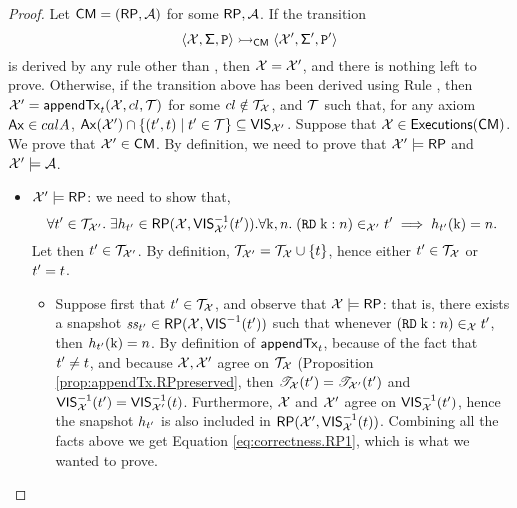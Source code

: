 \begin{proof}
Let $\mathsf{CM} = (\mathsf{RP}, \mathcal{A})$ for some $\mathsf{RP}, \mathcal{A}$.
If the transition 
\[ 
\langle \mathcal{X}, \mathsf{\Sigma}, \texttt{P} \rangle \rightarrowtail_{\mathsf{CM}} 
\langle \mathcal{X}', \mathsf{\Sigma}', \texttt{P}' \rangle
\] 
is derived by any rule other than , then $\mathcal{X} = \mathcal{X}'$, and there is nothing 
left to prove. 
Otherwise, if the transition above has been derived using Rule , 
then $\mathcal{X}' = \mathsf{appendTx}_{t}(\mathcal{X}, cl, \mathcal{T})$ for some $cl \notin \mathcal{T}_{\mathcal{X}}$, 
and $\mathcal{T}$ such that, for any axiom $\mathsf{Ax} \in calA$, $\mathsf{Ax}(\mathcal{X}') \cap \{(t', t) \mid t' \in \mathcal{T}\} 
\subseteq {\mathsf{VIS}}_{\mathcal{X}'}$. 
Suppose that $\mathcal{X} \in {\mathsf{Executions}}(\mathsf{CM})$. We prove that $\mathcal{X}' \in \mathsf{CM}$. 
By definition, we need to prove that $\mathcal{X}' \models \mathsf{RP}$ and $\mathcal{X}' \models \mathcal{A}$.
	\begin{itemize}
		\item  $\mathcal{X}' \models \mathsf{RP}$: we need to show that, 
		\begin{equation}
		\label{eq:correctness.RP1}
		\forall t' \in \mathcal{T}_{\mathcal{X}'}.\; \exists h_{t'} \in \mathsf{RP}(\mathcal{X}, {\mathsf{VIS}}^{-1}_{\mathcal{X}'}(t')).
		\forall \mathrm{k},n.\; ({{\tt RD}}\;\mathrm{k}:n) \in_{\mathcal{X}'} t' \implies h_{t'}(\mathrm{k}) = n.
		\end{equation}
		Let then $t' \in \mathcal{T}_{\mathcal{X}'}$. 
		By definition, $\mathcal{T}_{\mathcal{X}'} = \mathcal{T}_{\mathcal{X}} \cup \{ t \}$, hence either 
		$t' \in \mathcal{T}_{\mathcal{X}}$ or $t' = t$. 
		\begin{itemize}
			\item Suppose first that $t' \in \mathcal{T}_{\mathcal{X}}$, 
			and observe that $\mathcal{X} \models \mathsf{RP}$: that is, there exists a snapshot 
			$\mathit{ss}_{t'} \in \mathsf{RP}(\mathcal{X}, {\mathsf{VIS}}^{-1}(t'))$ such that whenever $({{\tt RD}}\;\mathrm{k}:n) \in_{\mathcal{X}} t'$, then 
			$h_{t'}(\mathrm{k}) = n$. By definition of $\mathsf{appendTx}_{t}$, because of the fact that 
			$t' \neq t$, and because $\mathcal{X}, \mathcal{X}'$ agree on $\mathcal{T}_{\mathcal{X}}$ 
			(Proposition \ref{prop:appendTx.RPpreserved}, 
			then  $\mathscr{T}_{\mathcal{X}}(t') = \mathscr{T}_{\mathcal{X}'}(t')$ and 
			${\mathsf{VIS}}_{\mathcal{X}}^{-1}(t') = {\mathsf{VIS}}_{\mathcal{X}'}^{-1}(t)$. 
			Furthermore, $\mathcal{X}$ and $\mathcal{X}'$ agree on ${\mathsf{VIS}}^{-1}_{\mathcal{X}}(t')$, 
			hence the snapshot $h_{t'}$ is also included in $\mathsf{RP}(\mathcal{X}', {\mathsf{VIS}}_{\mathcal{X}}^{-1}(t))$. 
			Combining all the facts above we get Equation \eqref{eq:correctness.RP1}, which is what we 
			wanted to prove.

\end{itemize}
\end{itemize}
\end{proof}
